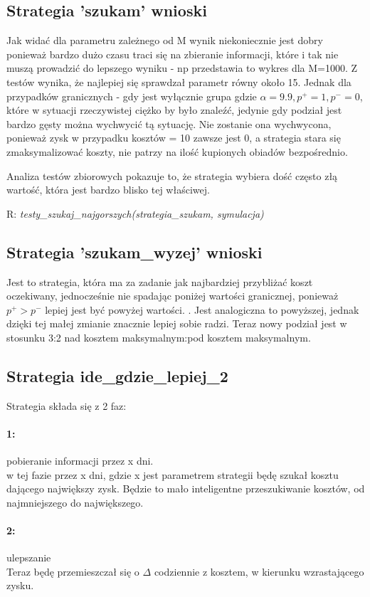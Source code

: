 \documentclass{article}
\begin{document}
\subsection{Strategia 'szukam' wnioski}   
Jak widać dla parametru zależnego od M wynik niekoniecznie jest dobry ponieważ bardzo dużo czasu traci się na 
zbieranie informacji, które i tak nie muszą prowadzić do lepszego wyniku - np przedstawia to wykres dla M=1000.
Z testów wynika, że najlepiej się sprawdzał parametr równy około 15. Jednak dla przypadków granicznych - gdy jest wyłącznie
grupa gdzie $\alpha = 9.9, p^+ = 1, p^- = 0$, które w sytuacji rzeczywistej ciężko by było znaleźć, jedynie gdy podział jest bardzo
gęsty można wychwycić tą sytuację. Nie zostanie ona wychwycona, ponieważ zysk w przypadku kosztów = 10 zawsze jest 0, a
strategia stara się zmaksymalizować koszty, nie patrzy na ilość kupionych obiadów bezpośrednio.

Analiza testów zbiorowych pokazuje to, że strategia wybiera dość często złą wartość, która jest bardzo blisko tej właściwej.


R: \textit{testy\_szukaj\_najgorszych(strategia\_szukam, symulacja)}
\subsection{Strategia 'szukam\_wyzej' wnioski}

Jest to strategia, która ma za zadanie jak najbardziej przybliżać koszt oczekiwany, jednocześnie nie 
spadając poniżej wartości granicznej, ponieważ $p^+ > p^-$ lepiej jest być powyżej wartości.
. Jest analogiczna to powyższej, jednak dzięki tej małej zmianie znacznie lepiej sobie radzi.
Teraz nowy podział jest w stosunku 3:2 nad kosztem maksymalnym:pod kosztem maksymalnym.

\subsection{Strategia ide\_gdzie\_lepiej\_2}
Strategia składa się z 2 faz:
\paragraph{1:} pobieranie informacji przez x dni.\\
w tej fazie przez x dni, gdzie x jest parametrem strategii będę szukał kosztu dającego największy zysk.
Będzie to mało inteligentne przeszukiwanie kosztów, od najmniejszego do największego.
\paragraph{2:} ulepszanie\\
Teraz będę przemieszczał się o $\Delta$ codziennie z kosztem, w kierunku wzrastającego zysku.
\end{document}
